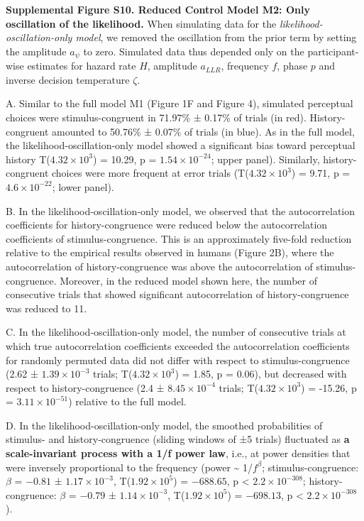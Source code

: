 \documentclass[
]{article}
\begin{document}
\textbf{Supplemental Figure S10. Reduced Control Model M2: Only
oscillation of the likelihood.} When simulating data for the
\emph{likelihood-oscillation-only model}, we removed the oscillation
from the prior term by setting the amplitude \(a_{\psi}\) to zero.
Simulated data thus depended only on the participant-wise estimates for
hazard rate \(H\), amplitude \(a_{LLR}\), frequency \(f\), phase \(p\)
and inverse decision temperature \(\zeta\).

A. Similar to the full model M1 (Figure 1F and Figure 4), simulated
perceptual choices were stimulus-congruent in 71.97\% ± 0.17\% of trials
(in red). History-congruent amounted to 50.76\% ± 0.07\% of trials (in
blue). As in the full model, the likelihood-oscillation-only model
showed a significant bias toward perceptual history
T(\ensuremath{4.32\times 10^{3}}) = 10.29, p =
\(\ensuremath{1.54\times 10^{-24}}\); upper panel). Similarly,
history-congruent choices were more frequent at error trials
(T(\ensuremath{4.32\times 10^{3}}) = 9.71, p =
\(\ensuremath{4.6\times 10^{-22}}\); lower panel).

B. In the likelihood-oscillation-only model, we observed that the
autocorrelation coefficients for history-congruence were reduced below
the autocorrelation coefficients of stimulus-congruence. This is an
approximately five-fold reduction relative to the empirical results
observed in humans (Figure 2B), where the autocorrelation of
history-congruence was above the autocorrelation of stimulus-congruence.
Moreover, in the reduced model shown here, the number of consecutive
trials that showed significant autocorrelation of history-congruence was
reduced to 11.

C. In the likelihood-oscillation-only model, the number of consecutive
trials at which true autocorrelation coefficients exceeded the
autocorrelation coefficients for randomly permuted data did not differ
with respect to stimulus-congruence (2.62 ±
\ensuremath{1.39\times 10^{-3}} trials;
T(\ensuremath{4.32\times 10^{3}}) = 1.85, p = \(0.06\)), but decreased
with respect to history-congruence (2.4 ±
\ensuremath{8.45\times 10^{-4}} trials;
T(\ensuremath{4.32\times 10^{3}}) = -15.26, p =
\(\ensuremath{3.11\times 10^{-51}}\)) relative to the full model.

D. In the likelihood-oscillation-only model, the smoothed probabilities
of stimulus- and history-congruence (sliding windows of ±5 trials)
fluctuated as \textbf{a scale-invariant process with a 1/f power law},
i.e., at power densities that were inversely proportional to the
frequency (power \textasciitilde{} 1/\(f^\beta\); stimulus-congruence:
\(\beta\) = \(-0.81\) ± \(\ensuremath{1.17\times 10^{-3}}\),
T(\(\ensuremath{1.92\times 10^{5}}\)) = \(-688.65\), p < \(\ensuremath{2.2\times 10^{-308}}\);
history-congruence: \(\beta\) = \(-0.79\) ±
\(\ensuremath{1.14\times 10^{-3}}\),
T(\(\ensuremath{1.92\times 10^{5}}\)) = \(-698.13\), p < \(\ensuremath{2.2\times 10^{-308}}\)).
\end{document}
